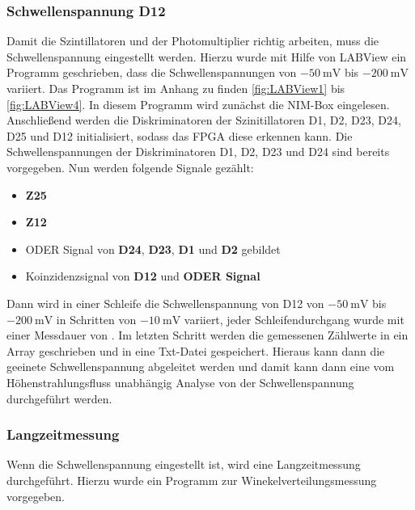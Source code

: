 \documentclass{article}
\begin{document}
\subsubsection*{Schwellenspannung D12}
Damit die Szintillatoren und der Photomultiplier richtig arbeiten, muss die Schwellenspannung eingestellt werden.
Hierzu wurde mit Hilfe von LABView ein Programm geschrieben, dass die Schwellenspannungen von $\SI{-50}{\milli\volt}$ bis $\SI{-200}{\milli\volt}$ variiert.
Das Programm ist im Anhang zu finden \ref{fig:LABView1} bis \ref{fig:LABView4}.
In diesem Programm wird zunächst die NIM-Box eingelesen. Anschließend werden die Diskriminatoren der Szinitillatoren D1, D2, D23, D24, D25 und D12 initialisiert, sodass das FPGA diese erkennen kann.	
Die Schwellenspannungen der Diskriminatoren D1, D2, D23 und D24 sind bereits vorgegeben.
Nun werden folgende Signale gezählt:
\begin{itemize}
    \item \textbf{Z25}
    \item \textbf{Z12}
    \item ODER Signal von \textbf{D24}, \textbf{D23}, \textbf{D1} und \textbf{D2} gebildet	
    \item Koinzidenzsignal von \textbf{D12} und \textbf{ODER Signal}  	
\end{itemize}
Dann wird in einer Schleife die Schwellenspannung von D12 von $\SI{-50}{\milli\volt}$ bis $\SI{-200}{\milli\volt}$ in Schritten von $\SI{-10}{\milli\volt}$ variiert, jeder Schleifendurchgang wurde mit
einer Messdauer von \textbf{\color[red]{HIER NOCH ZEIT EINFÜGEN}}.
Im letzten Schritt werden die gemessenen Zählwerte in ein Array geschrieben und in eine Txt-Datei gespeichert.
Hieraus kann dann die geeinete Schwellenspannung abgeleitet werden und
damit kann dann eine vom Höhenstrahlungsfluss unabhängig Analyse von der Schwellenspannung durchgeführt werden.

\subsubsection*{Langzeitmessung}
Wenn die Schwellenspannung eingestellt ist, wird eine Langzeitmessung durchgeführt.
Hierzu wurde ein Programm zur Winekelverteilungsmessung vorgegeben. 
\textbf{\color[red]{HIER MEHR SCHREIBEN}}
\end{document}
